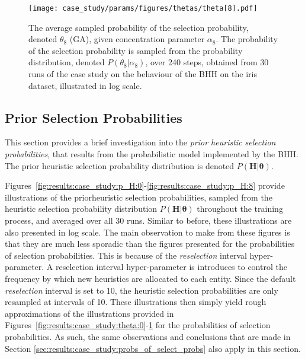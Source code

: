 \begin{figure}[htpb]
	\centering
	\texttt{[image: case\_study/params/figures/thetas/theta[8].pdf]}
	\caption{The average sampled probability of the selection probability, denoted $\theta_{8}$ (\acs{GA}), given concentration parameter $\alpha_{8}$. The probability of the selection probability is sampled from the probability distribution, denoted $P(\theta_{8} \vert \alpha_{8})$, over 240 steps, obtained from 30 runs of the case study on the behaviour of the \acs{BHH} on the iris dataset, illustrated in log scale.}
	\label{fig:results:case_study:theta:8}
\end{figure}


\subsection{Prior Selection Probabilities}\label{sec:results:case_study:prior_selec_prob}

This section provides a brief investigation into the \textit{prior heuristic selection probabilities}, that results from the probabilistic model implemented by the \acs{BHH}. The prior heuristic selection probability distribution is denoted $P(\boldsymbol{H} \vert \boldsymbol{\theta})$.

Figures~\ref{fig:results:case_study:p_H:0}-\ref{fig:results:case_study:p_H:8} provide illustrations of the priorheuristic selection probabilities, sampled from the heuristic selection probability distribution $P(\boldsymbol{H} \vert \boldsymbol{\theta})$ throughout the training process, and averaged over all 30 runs. Similar to before, these illustrations are also presented in log scale. The main observation to make from these figures is that they are much less sporadic than the figures presented for the probabilities of selection probabilities. This is because of the \textit{reselection} interval hyper-parameter. A reselection interval hyper-parameter is introduces to control the frequency by which new heuristics are allocated to each entity. Since the default \textit{reselection} interval is set to 10, the heuristic selection probabilities are only resampled at intervals of 10. These illustrations then simply yield rough approximations of the illustrations provided in Figures~\ref{fig:results:case_study:theta:0}-\ref{fig:results:case_study:theta:8} for the probabilities of selection probabilities. As such, the same observations and conclusions that are made in Section \ref{sec:results:case_study:probs_of_select_probs} also apply in this section.

